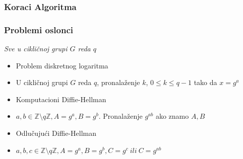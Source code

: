 \documentclass[14pt]{beamer}
\begin{document}
\begin{frame}[fragile]\frametitle{Koraci Algoritma}
    \begin{table}[h]
        \begin{center}
        \caption{Šematski prikaz razmena promenljivih tokom algoritma}
        \end{center}
    \end{table}

\end{frame}

\begin{frame}[fragile]\frametitle{Problemi oslonci}
    \small
    \emph{Sve u cikličnoj grupi $G$ reda $q$}
	\begin{itemize}	
		\item Problem diskretnog logaritma
        \item[] U cikličnoj grupi $G$ reda $q$, pronalaženje $k$, $0 \le k \le q - 1$ tako da $x = g^a$ %
        \item Komputacioni Diffie-Hellman
        \item[] $a, b \in \mathbb{Z}\setminus q\mathbb{Z}, A = g^a, B = g^b$. Pronalaženje $g^{ab}$ ako znamo $A,B$ %
        \item Odlučujući Diffie-Hellman
        \item[] $a, b, c \in \mathbb{Z}\setminus q\mathbb{Z}, A=g^a, B=g^b, C=g^c\ ili\ C=g^{ab}$
	\end{itemize}
\end{frame}
\end{document}
